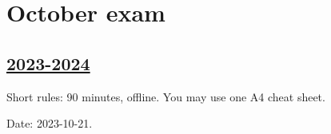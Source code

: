 


\newpage
\thispagestyle{empty}
\section{October exam}



\subsection[2023-2024]{\hyperref[sec:sol_kr_01_2023_2024]{2023-2024}}
\label{sec:kr_01_2023_2024} %

Short rules: 90 minutes, offline. You may use one A4 cheat sheet.

Date: 2023-10-21.


